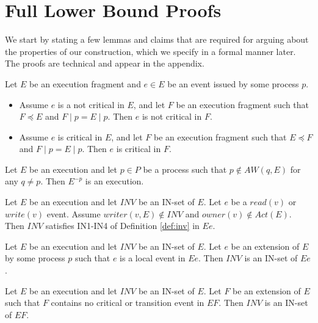 \section{Full Lower Bound Proofs}
\label{sec:FullProof}

We start by stating a few lemmas and claims that are required for arguing about the properties of our construction, which we specify in a formal manner later. The proofs are technical and appear in the appendix.

\begin{claim-num}  \label{claim: maintain-criticalness}
	Let $E$ be an execution fragment and $e \in E$ be an event issued by some process $p$.
	\begin{itemize}
		\item Assume $e$ is a not critical in $E$, and let $F$ be an execution fragment such that $F \preceq E$ and $F \mid p = E \mid p$. Then $e$ is not critical in $F$.
		\item Assume $e$ is critical in $E$, and let $F$ be an execution fragment such that $E \preceq F$ and $F \mid p = E \mid p$. Then $e$ is critical in $F$.
	\end{itemize}
\end{claim-num}

\begin{lemma} \label{lem: sub-execution}
	Let $E$ be an execution and let $p \in P$ be a process such that $p \notin AW(q,E)$ for any $q \neq p$. Then $E^{-p}$ is an execution.
\end{lemma}

\begin{lemma}  \label{lem: access-visible-variable}
	Let $E$ be an execution and let $\mathit{INV}$ be an IN-set of $E$. Let $e$ be a $read(v)$ or $write(v)$ event. Assume $writer(v,E) \notin \mathit{INV}$ and $owner(v) \notin Act(E)$. Then $\mathit{INV}$ satisfies IN1-IN4 of Definition \ref{def:inv} in $E e$.
\end{lemma}

\begin{claim} \label{claim: local-event-extension}
	Let $E$ be an execution and let $\mathit{INV}$ be an IN-set of $E$. Let $e$ be an extension of $E$ by some process $p$ such that $e$ is a local event in $E e$. Then $\mathit{INV}$ is an IN-set of $E e$.
\end{claim}

\begin{lemma} \label{lem: non-critical-extension}
	Let $E$ be an execution and let $\mathit{INV}$ be an IN-set of $E$. Let $F$ be an extension of $E$ such that $F$ contains no critical or transition event in $E F$. Then $\mathit{INV}$ is an IN-set of $E F$.
\end{lemma}

